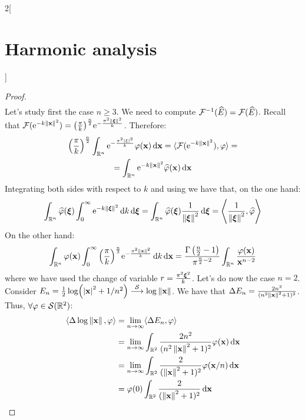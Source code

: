 \documentclass[../../../main_math.tex]{subfiles}
\begin{document}
\begin{multicols}{2}[\section{Harmonic analysis}]
\begin{proof}
\begin{multline*}
    \end{multline*}
    Let's study first the case $n\geq 3$. We need to compute $\mathcal{F}^{-1}(\widehat{E})=\mathcal{F}(\widehat{E})$. Recall that $\mathcal{F}(\mathrm{e}^{-k\left\|\boldsymbol{\mathrm{x}}\right\|^2})= {\left(\frac{\pi}{k}\right)}^{\frac{n}{2}}\mathrm{e}^{-\frac{\pi^2\left\|\boldsymbol{\mathrm{\xi}}\right\|^2}{k}}$. Therefore:
    \begin{multline*}
      {\left(\frac{\pi}{k}\right)}^{\frac{n}{2}}\int_{\mathbb{R}^n} \mathrm{e}^{-\frac{\pi^2\abs{\xi}^2}{k}}\varphi(\boldsymbol{\mathrm{x}})\dd{\boldsymbol{\mathrm{x}}}=\langle \mathcal{F}(\mathrm{e}^{-k\left\|\boldsymbol{\mathrm{x}}\right\|^2}),\varphi\rangle=\\=\int_{\mathbb{R}^n} \mathrm{e}^{-k\left\|\boldsymbol{\mathrm{x}}\right\|^2}\widehat{\varphi}(\boldsymbol{\mathrm{x}})\dd{\boldsymbol{\mathrm{x}}}
    \end{multline*}
    Integrating both sides with respect to $k$ and using  we have that, on the one hand:
    \begin{equation*}
      \int_{\mathbb{R}^n} \widehat{\varphi}(\boldsymbol{\mathrm{\xi}})\int_0^\infty\mathrm{e}^{-k\left\|\boldsymbol{\mathrm{\xi}}\right\|^2}\dd{k}\dd{\boldsymbol{\mathrm{\xi}}}=\int_{\mathbb{R}^n} \widehat{\varphi}(\boldsymbol{\mathrm{\xi}})\frac{1}{\left\|\boldsymbol{\mathrm{\xi}}\right\|^2}\dd{\boldsymbol{\mathrm{\xi}}}=\left\langle \frac{1}{\left\|\boldsymbol{\mathrm{\xi}}\right\|^2}, \widehat\varphi\right\rangle
    \end{equation*}
    On the other hand:
    $$\int_{\mathbb{R}^n}\varphi(\boldsymbol{\mathrm{x}})\int_{0}^\infty{\left(\frac{\pi}{k}\right)}^{\frac{n}{2}} \mathrm{e}^{-\frac{\pi^2\left\|\boldsymbol{\mathrm{x}}\right\|^2}{k}}\dd{k}\dd{\boldsymbol{\mathrm{x}}}=\frac{\Gamma\left(\frac{n}{2}-1\right)}{\pi^{\frac{n}{2}-2}}\int_{\mathbb{R}^n}\frac{\varphi(\boldsymbol{\mathrm{x}})}{\boldsymbol{\mathrm{x}}^{n-2}}$$
    where we have used the change of variable $r=\frac{\pi^2\boldsymbol{\mathrm{\xi}}^2}{k}$. Let's do now the case $n=2$. Consider $E_n=\frac{1}{2}\log(\abs{\boldsymbol{\mathrm{x}}}^2+1/n^2)\overset{\mathcal{S}}{\longrightarrow}\log\left\|\boldsymbol{\mathrm{x}}\right\|$. We have that $\Delta E_n = \frac{2n^2}{(n^2\left\|\boldsymbol{\mathrm{x}}\right\|^2+1)^2}$. Thus, $\forall \varphi\in \mathcal{S}(\mathbb{R}^2)$:
    \begin{align*}
      \langle \laplacian\log\norm{\vf{x}},\varphi\rangle & = \lim_{n\to\infty}\langle \laplacian E_n,\varphi\rangle                                        \\
                                                         & = \lim_{n\to\infty}\int_{\RR^2} \frac{2n^2}{(n^2\norm{\vf{x}}^2+1)^2}\varphi(\vf{x})\dd{\vf{x}} \\
                                                         & = \lim_{n\to\infty}\int_{\RR^2} \frac{2}{(\norm{\vf{x}}^2+1)^2}\varphi(\vf{x}/n)\dd{\vf{x}}     \\
                                                         & =\varphi(0)\int_{\RR^2}\frac{2}{(\norm{\vf{x}}^2+1)^2}\dd{\vf{x}}                               \\

\end{align*}
\end{proof}
\end{multicols}
\end{document}
